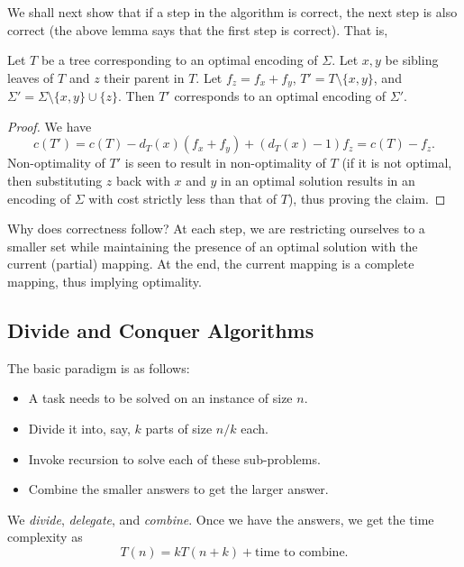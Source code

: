 We shall next show that if a step in the algorithm is correct, the next step is also correct (the above lemma says that the first step is correct). That is,

\begin{lemma}
	Let $T$ be a tree corresponding to an optimal encoding of $\Sigma$. Let $x,y$ be sibling leaves of $T$ and $z$ their parent in $T$. Let $f_z=f_x+f_y$, $T'=T\setminus\{x,y\}$, and $\Sigma'=\Sigma\setminus\{x,y\}\cup\{z\}$. Then $T'$ corresponds to an optimal encoding of $\Sigma'$.
\end{lemma}
\begin{proof}
	We have
	\[ c(T') = c(T) - d_T(x)(f_x+f_y) + (d_T(x)-1)f_z = c(T) - f_z. \]
	Non-optimality of $T'$ is seen to result in non-optimality of $T$ (if it is not optimal, then substituting $z$ back with $x$ and $y$ in an optimal solution results in an encoding of $\Sigma$ with cost strictly less than that of $T$), thus proving the claim.
\end{proof}

Why does correctness follow? At each step, we are restricting ourselves to a smaller set while maintaining the presence of an optimal solution with the current (partial) mapping. At the end, the current mapping is a complete mapping, thus implying optimality.

\subsection{Divide and Conquer Algorithms}


The basic paradigm is as follows:
\begin{itemize}
	\item A task needs to be solved on an instance of size $n$.
	\item Divide it into, say, $k$ parts of size $n/k$ each.
	\item Invoke recursion to solve each of these sub-problems.
	\item Combine the smaller answers to get the larger answer.
\end{itemize}

We \textit{divide}, \textit{delegate}, and \textit{combine}. Once we have the answers, we get the time complexity as
\[ T(n) = k T(n+k) + \text{time to combine}. \]

